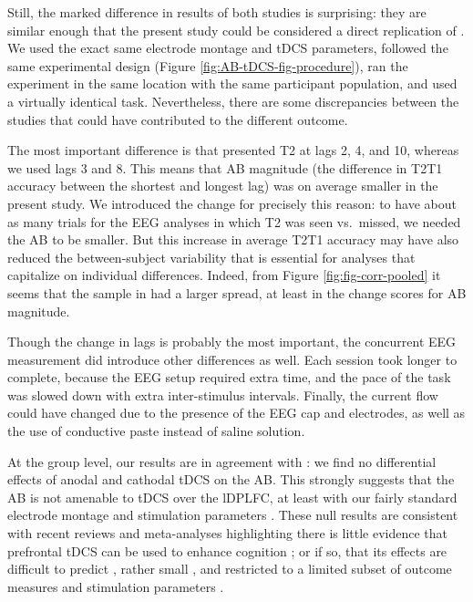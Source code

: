 \documentclass[11pt,]{memoir}
\begin{document}
Still, the marked difference in results of both studies is surprising: they are similar enough that the present study could be considered a direct replication of \textcites{London2015}{Zwaan2018}. We used the exact same electrode montage and tDCS parameters, followed the same experimental design (Figure \ref{fig:AB-tDCS-fig-procedure}), ran the experiment in the same location with the same participant population, and used a virtually identical task. Nevertheless, there are some discrepancies between the studies that could have contributed to the different outcome.

The most important difference is that \textcite{London2015} presented T2 at lags 2, 4, and 10, whereas we used lags 3 and 8. This means that AB magnitude (the difference in T2\textbar{}T1 accuracy between the shortest and longest lag) was on average smaller in the present study. We introduced the change for precisely this reason: to have about as many trials for the EEG analyses in which T2 was seen vs.~missed, we needed the AB to be smaller. But this increase in average T2\textbar{}T1 accuracy may have also reduced the between-subject variability that is essential for analyses that capitalize on individual differences. Indeed, from Figure \ref{fig:fig-corr-pooled} it seems that the sample in \textcite{London2015} had a larger spread, at least in the change scores for AB magnitude.

Though the change in lags is probably the most important, the concurrent EEG measurement did introduce other differences as well. Each session took longer to complete, because the EEG setup required extra time, and the pace of the task was slowed down with extra inter-stimulus intervals. Finally, the current flow could have changed due to the presence of the EEG cap and electrodes, as well as the use of conductive paste instead of saline solution.

At the group level, our results are in agreement with \textcite{London2015}: we find no differential effects of anodal and cathodal tDCS on the AB. This strongly suggests that the AB is not amenable to tDCS over the lDPLFC, at least with our fairly standard electrode montage and stimulation parameters \autocite{Santarnecchi2015}. These null results are consistent with recent reviews and meta-analyses highlighting there is little evidence that prefrontal tDCS can be used to enhance cognition \autocite{Medina2017}; or if so, that its effects are difficult to predict \autocite{Tremblay2014a}, rather small \autocite{Dedoncker2016a}, and restricted to a limited subset of outcome measures and stimulation parameters \autocite{Imburgio2018}.
\end{document}
